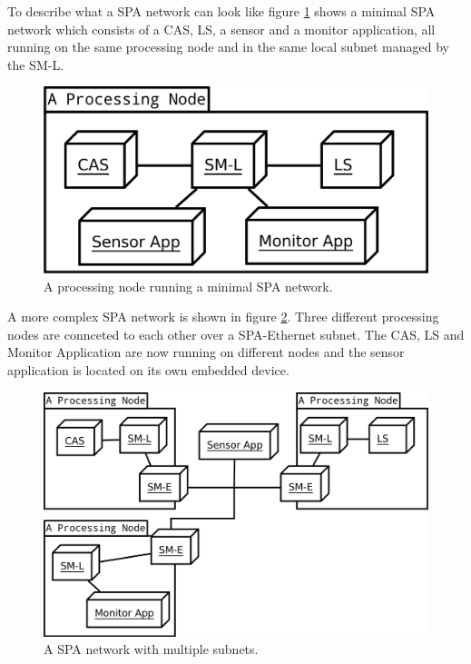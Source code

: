 To describe what a SPA network can look like figure
\ref{fig:minimal_spa_network} shows a minimal SPA network which consists of a
CAS, LS, a sensor and a monitor application, all running on the same processing
node and in the same local subnet managed by the SM-L.

\begin{figure}[h]
    \centering
    \includegraphics[width=\textwidth]{figures/minimal_spa_network}
    \caption{A processing node running a minimal SPA network.}
    \label{fig:minimal_spa_network}
\end{figure}

A more complex SPA network is shown in figure \ref{fig:complex_spa_network}.
Three different processing nodes are connceted to each other over a
SPA-Ethernet subnet. The CAS, LS and Monitor Application are now running on
different nodes and the sensor application is located on its own embedded
device.

\begin{figure}[h]
    \centering
    \includegraphics[width=\textwidth]{figures/complex_spa_network}
    \caption{A SPA network with multiple subnets.}
    \label{fig:complex_spa_network}
\end{figure}

